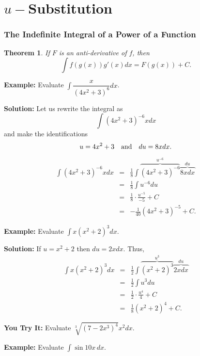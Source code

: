 \documentclass[titlepage,a4paper,12pt]{report}
\newtheorem{theorem}{Theorem}[section]
\begin{document}
\section{$u-$Substitution}
\subsubsection{The Indefinite Integral of a Power of a Function}
\begin{theorem}
If $F$ is an anti-derivative of $f$, then 
\begin{equation*}
\int f(g(x))g'(x)dx=F(g(x))+C.
\end{equation*}
\end{theorem}

\noindent \textbf{Example:} Evaluate $\displaystyle \int \dfrac{x}{(4x^2+3)^6} dx$.

\noindent \textbf{Solution:} Let us rewrite the integral as 
\begin{equation*}
\int (4x^2+3)^{-6} xdx
\end{equation*}
and make the identifications 
\begin{equation*}
u=4x^2+3 \quad \hbox{and} \quad du=8xdx.
\end{equation*}
\begin{eqnarray*}
\int (4x^2+3)^{-6} xdx  &=&\frac{1}{8} \int \overbrace{(4x^2+3)^{-6}}^{u^{-6}} \overbrace{8x dx}^{du}\\
&=&\frac{1}{8}\int u^{-6} du \\
&=& \frac{1}{8} \cdot \frac{u^{-5}}{-5}+C\\
&=& -\frac{1}{40}(4x^2+3)^{-5} +C.
\end{eqnarray*}

\noindent \textbf{Example:} Evaluate $\displaystyle \int x(x^2+2)^3 dx$.

\noindent \textbf{Solution:} If $u=x^2+2$ then $du=2xdx$. Thus, 
\begin{eqnarray*}
\int x(x^2+2)^3 dx &=& \frac{1}{2} \int \overbrace{(x^2+2)^3}^{u^3} \overbrace{2xdx}^{du}\\
&=& \frac{1}{2}\int u^3 du\\
&=& \frac{1}{2}\cdot \frac{u^4}{4} +C\\
&=& \frac{1}{8} (x^2+2)^4 +C.
\end{eqnarray*}

\noindent \textbf{You Try It:} Evaluate $\displaystyle \sqrt[3]{(7-2x^3)^4}x^2 dx$.

\noindent \textbf{Example:} Evaluate $\displaystyle \int \sin 10x\, dx$.
\end{document}
